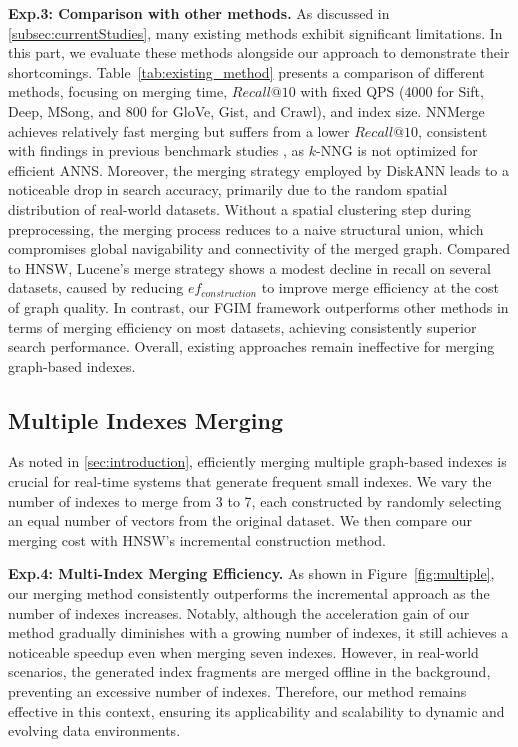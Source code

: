 \documentclass[acmsmall]{acmart}
\theoremstyle{remark}
\theoremstyle{definition}
\begin{document}
\noindent\textbf{Exp.3: Comparison with other methods.} As discussed in \textsection\ref{subsec:currentStudies}, many existing methods exhibit significant limitations. In this part, we evaluate these methods alongside our approach to demonstrate their shortcomings. Table~\ref{tab:existing_method} presents a comparison of different methods, focusing on merging time, $Recall@10$ with fixed QPS (4000 for Sift, Deep, MSong, and 800 for GloVe, Gist, and Crawl), and index size. NNMerge achieves relatively fast merging but suffers from a lower $Recall@10$, consistent with findings in previous benchmark studies \cite{li2019approximate,wang2021comprehensive}, as $k$-NNG is not optimized for efficient ANNS. Moreover, the merging strategy employed by DiskANN leads to a noticeable drop in search accuracy, primarily due to the random spatial distribution of real-world datasets. Without a spatial clustering step during preprocessing, the merging process reduces to a naive structural union, which compromises global navigability and connectivity of the merged graph.
Compared to HNSW, Lucene’s merge strategy shows a modest decline in recall on several datasets, caused by reducing $ef_{construction}$ to improve merge efficiency at the cost of graph quality.
	In contrast, our FGIM framework outperforms other methods in terms of merging efficiency on most datasets, achieving consistently superior search performance. Overall, existing approaches remain ineffective for merging graph-based indexes. 


\subsection{Multiple Indexes Merging}
\label{subsec:multiple}

As noted in \textsection\ref{sec:introduction}, efficiently merging multiple graph-based indexes is crucial for real-time systems that generate frequent small indexes. We vary the number of indexes to merge from 3 to 7, each constructed by randomly selecting an equal number of vectors from the original dataset. We then compare our merging cost with HNSW's incremental construction method.

\noindent\textbf{Exp.4: Multi-Index Merging Efficiency.} As shown in Figure~\ref{fig:multiple}, our merging method consistently outperforms the incremental approach as the number of indexes increases. Notably, although the acceleration gain of our method gradually diminishes with a growing number of indexes, it still achieves a noticeable speedup even when merging seven indexes. However, in real-world scenarios, the generated index fragments are merged offline in the background, preventing an excessive number of indexes. Therefore, our method remains effective in this context, ensuring its applicability and scalability to dynamic and evolving data environments.
\end{document}
